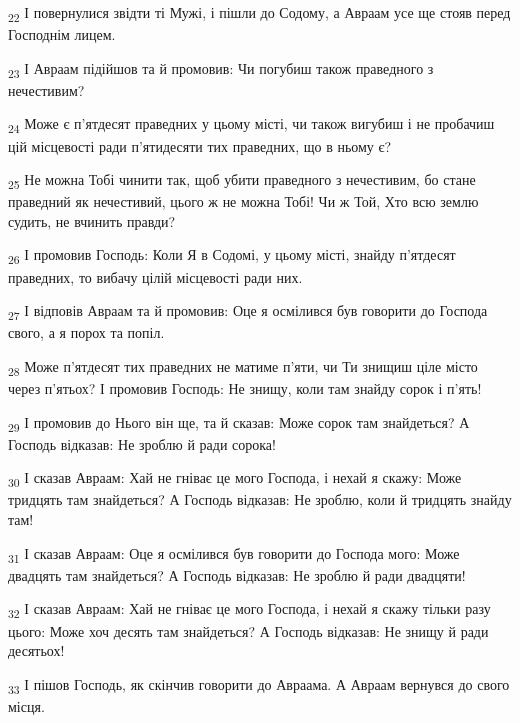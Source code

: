 \begin{tcolorbox}
\textsubscript{22} І повернулися звідти ті Мужі, і пішли до Содому, а Авраам усе ще стояв перед Господнім лицем.
\end{tcolorbox}
\begin{tcolorbox}
\textsubscript{23} І Авраам підійшов та й промовив: Чи погубиш також праведного з нечестивим?
\end{tcolorbox}
\begin{tcolorbox}
\textsubscript{24} Може є п'ятдесят праведних у цьому місті, чи також вигубиш і не пробачиш цій місцевості ради п'ятидесяти тих праведних, що в ньому є?
\end{tcolorbox}
\begin{tcolorbox}
\textsubscript{25} Не можна Тобі чинити так, щоб убити праведного з нечестивим, бо стане праведний як нечестивий, цього ж не можна Тобі! Чи ж Той, Хто всю землю судить, не вчинить правди?
\end{tcolorbox}
\begin{tcolorbox}
\textsubscript{26} І промовив Господь: Коли Я в Содомі, у цьому місті, знайду п'ятдесят праведних, то вибачу цілій місцевості ради них.
\end{tcolorbox}
\begin{tcolorbox}
\textsubscript{27} І відповів Авраам та й промовив: Оце я осмілився був говорити до Господа свого, а я порох та попіл.
\end{tcolorbox}
\begin{tcolorbox}
\textsubscript{28} Може п'ятдесят тих праведних не матиме п'яти, чи Ти знищиш ціле місто через п'ятьох? І промовив Господь: Не знищу, коли там знайду сорок і п'ять!
\end{tcolorbox}
\begin{tcolorbox}
\textsubscript{29} І промовив до Нього він ще, та й сказав: Може сорок там знайдеться? А Господь відказав: Не зроблю й ради сорока!
\end{tcolorbox}
\begin{tcolorbox}
\textsubscript{30} І сказав Авраам: Хай не гніває це мого Господа, і нехай я скажу: Може тридцять там знайдеться? А Господь відказав: Не зроблю, коли й тридцять знайду там!
\end{tcolorbox}
\begin{tcolorbox}
\textsubscript{31} І сказав Авраам: Оце я осмілився був говорити до Господа мого: Може двадцять там знайдеться? А Господь відказав: Не зроблю й ради двадцяти!
\end{tcolorbox}
\begin{tcolorbox}
\textsubscript{32} І сказав Авраам: Хай не гніває це мого Господа, і нехай я скажу тільки разу цього: Може хоч десять там знайдеться? А Господь відказав: Не знищу й ради десятьох!
\end{tcolorbox}
\begin{tcolorbox}
\textsubscript{33} І пішов Господь, як скінчив говорити до Авраама. А Авраам вернувся до свого місця.
\end{tcolorbox}
